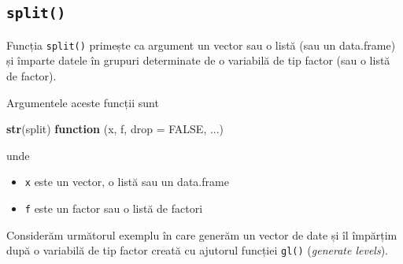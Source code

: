 \documentclass[]{article}
\newenvironment{Shaded}{\begin{snugshade}}{\end{snugshade}}
\newcommand{\KeywordTok}[1]{\textcolor[rgb]{0.13,0.29,0.53}{\textbf{#1}}}
\newcommand{\DataTypeTok}[1]{\textcolor[rgb]{0.13,0.29,0.53}{#1}}
\newcommand{\OtherTok}[1]{\textcolor[rgb]{0.56,0.35,0.01}{#1}}
\newcommand{\ControlFlowTok}[1]{\textcolor[rgb]{0.13,0.29,0.53}{\textbf{#1}}}
\newcommand{\NormalTok}[1]{#1}
\providecommand{\tightlist}{%
  \setlength{\itemsep}{0pt}\setlength{\parskip}{0pt}}
\begin{document}
\subsection{\texorpdfstring{\texttt{split()}}{split()}}\label{split}

Funcția \texttt{split()} primește ca argument un vector sau o listă (sau
un data.frame) și împarte datele în grupuri determinate de o variabilă
de tip factor (sau o listă de factor).

Argumentele aceste funcții sunt

\begin{Shaded}
\begin{Highlighting}[]
\KeywordTok{str}\NormalTok{(split)}
\ControlFlowTok{function}\NormalTok{ (x, f, }\DataTypeTok{drop =} \OtherTok{FALSE}\NormalTok{, ...)  }
\end{Highlighting}
\end{Shaded}

unde

\begin{itemize}
\tightlist
\item
  \texttt{x} este un vector, o listă sau un data.frame
\item
  \texttt{f} este un factor sau o listă de factori
\end{itemize}

Considerăm următorul exemplu în care generăm un vector de date și îl
împărțim după o variabilă de tip factor creată cu ajutorul funcției
\texttt{gl()} (\emph{generate levels}).
\end{document}
